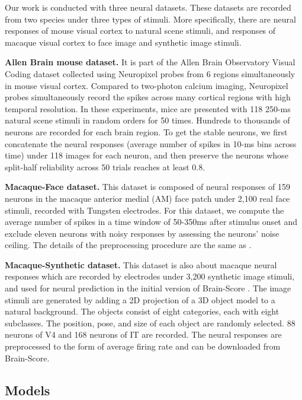 \documentclass[letterpaper]{article} %
\begin{document}
Our work is conducted with three neural datasets. These datasets are recorded from two species under three types of stimuli. More specifically, there are neural responses of mouse visual cortex to natural scene stimuli, and responses of macaque visual cortex to face image and synthetic image stimuli.

\textbf{Allen Brain mouse dataset.} It is part of the Allen Brain Observatory Visual Coding dataset \cite{siegle2021survey} collected using Neuropixel probes from 6 regions simultaneously in mouse visual cortex. Compared to two-photon calcium imaging, Neuropixel probes simultaneously record the spikes across many cortical regions with high temporal resolution. In these experiments, mice are presented with 118 250-ms natural scene stimuli in random orders for 50 times. Hundreds to thousands of neurons are recorded for each brain region. To get the stable neurons, we first concatenate the neural responses (average number of spikes in 10-ms bins across time) under 118 images for each neuron, and then preserve the neurons whose split-half reliability across 50 trials reaches at least 0.8.

\textbf{Macaque-Face dataset.} This dataset \cite{chang2021explaining} is composed of neural responses of 159 neurons in the macaque anterior medial (AM) face patch under 2,100 real face stimuli, recorded with Tungsten electrodes. For this dataset, we compute the average number of spikes in a time window of 50-350ms after stimulus onset and exclude eleven neurons with noisy responses by assessing the neurons' noise ceiling. The details of the preprocessing procedure are the same as \cite{chang2021explaining}.

\textbf{Macaque-Synthetic dataset.} This dataset \cite{majaj2015simple} is also about macaque neural responses which are recorded by electrodes under 3,200 synthetic image stimuli, and used for neural prediction in the initial version of Brain-Score \cite{schrimpf2020brain}. The image stimuli are generated by adding a 2D projection of a 3D object model to a natural background. The objects consist of eight categories, each with eight subclasses. The position, pose, and size of each object are randomly selected. 88 neurons of V4 and 168 neurons of IT are recorded. The neural responses are preprocessed to the form of average firing rate and can be downloaded from Brain-Score.

\subsection{Models}
\label{methods.model}
\end{document}

